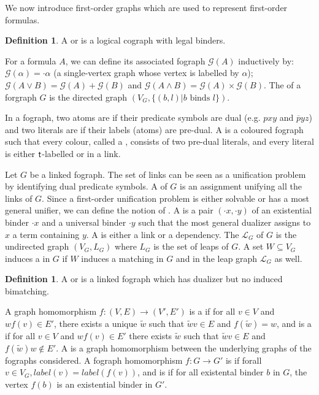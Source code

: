 \documentclass[conference,twosided,10pt]{IEEEtran}
\theoremstyle{definition}
\newtheorem{definition}[thm]{Definition}
\newcommand{\Gr}{\mathcal{G}}
\newcommand{\LG}{\mathcal{L}}
\begin{document}
We now introduce first-order graphs which are used to represent first-order formulas.

\begin{definition}
A  or  is a logical cograph with legal binders.
\end{definition}

For a formula $A$, we can define its associated fograph $\Gr(A)$ inductively by: $\Gr(\alpha) = \cdot \alpha$ (a single-vertex graph whose vertex is labelled by $\alpha$); $\Gr(A \vee B) = \Gr(A) + \Gr(B)$ and $\Gr(A \wedge B) = \Gr(A) \times \Gr(B)$.
The  of a forgraph $G$ is the directed graph $(V_G, \{(b,
l) | b \text{ binds } l\})$.

In a fograph, two atoms are  if their predicate symbols are dual
(e.g. $pxy$ and $\overline{p}yz$) and two literals are  if their
labels (atoms) are pre-dual. A  is a coloured fograph such
that every colour, called a , consists of two pre-dual literals, and
every literal is either ${\mathsf t}$-labelled or in a link.

Let $G$ be a linked fograph. The set of links can be seen as a unification problem
by identifying dual predicate symbols. A  of $G$ is an assignment
unifying all the links of $G$. Since a first-order unification problem is either
solvable or has a most general unifier, we can define the notion of . A  is a pair $(\cdot x, \cdot y)$ of an
existential binder $\cdot x$ and a universal binder $\cdot y$ such that the most
general dualizer assigns to $x$ a term containing $y$. A  is either a
link or a dependency. The  $\LG_G$ of $G$ is the undirected graph $(V_G,
L_G)$ where $L_G$ is the set of leaps of $G$. A set $W \subseteq V_G$ induces a
 in $G$ if $W$ induces a matching in $G$ and in the leap graph
$\LG_G$ as well.

\begin{definition}
A  or  is a linked fograph which has
dualizer but no induced bimatching.  
\end{definition}

A graph homomorphism $f: (V, E) \rightarrow (V', E')$ is a  if
for all $v \in V$ and $wf(v) \in E'$, there exists a unique $\tilde{w}$ such
that $\tilde{w}v \in E$ and $f(\tilde{w}) = w$, and is a 
if for all $v \in V$ and $wf(v) \in E'$ there exists $\tilde{w}$ such that
$\tilde{w}v \in E$ and $f(\tilde{w})w \notin E'$. A 
is a graph homomorphism between the underlying graphs of the fographs
considered. A fograph homomorphism $f : G \rightarrow G'$ is
 if forall $v \in V_G, label(v) = label(f(v))$, and is
 if for all existental binder $b$ in $G$, the
vertex $f(b)$ is an existential binder in $G'$.
\end{document}

